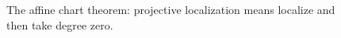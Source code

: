 \begin{figure}[ht]\centering
{}
\caption{The affine chart theorem: projective localization means localize and then take degree zero.}\label{fig:vi35-04}\end{figure}